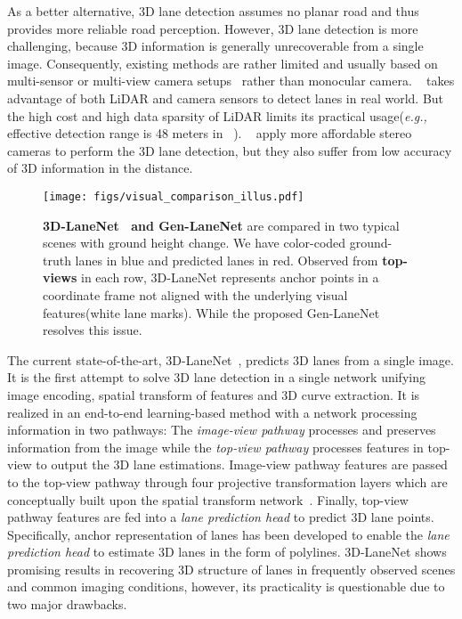 \documentclass[10pt,twocolumn,letterpaper]{article}
\begin{document}
As a better alternative, 3D lane detection assumes no planar road and thus provides more reliable road perception. However, 3D lane detection is more challenging, because 3D information is generally unrecoverable from a single image. Consequently, existing methods are rather limited and usually based on multi-sensor or multi-view camera setups~\cite{YawPitchRool2002,3DLaneStereo2004,MultiSensor2019} rather than monocular camera. ~\cite{MultiSensor2019} takes advantage of both LiDAR and camera sensors to detect lanes in real world. But the high cost and high data sparsity of LiDAR limits its practical usage({\it e.g.,} effective detection range is 48 meters in ~\cite{MultiSensor2019}). ~\cite{YawPitchRool2002,3DLaneStereo2004} apply more affordable stereo cameras to perform the 3D lane detection, but they also suffer from low accuracy of 3D information in the distance.

\begin{figure*}[!h]
  \centering
  \texttt{[image: figs/visual\_comparison\_illus.pdf]}
\caption{{\bf 3D-LaneNet~\cite{Garnett:etal:ICCV2019} and Gen-LaneNet} are compared in two typical scenes with ground height change. We have color-coded ground-truth lanes in blue and predicted lanes in red. Observed from {\bf top-views} in each row, 3D-LaneNet represents anchor points in a coordinate frame not aligned with the underlying visual features(white lane marks). While the proposed Gen-LaneNet resolves this issue.} 
  \label{fig:visual:compare}
\end{figure*}








The current state-of-the-art, 3D-LaneNet~\cite{Garnett:etal:ICCV2019}, predicts 3D lanes from a single image. It is the first attempt to solve 3D lane detection in a single network unifying image encoding, spatial transform of features and 3D curve extraction. It is realized in an end-to-end learning-based method with a network processing information in two pathways: The \textit{image-view pathway} processes and preserves information from the image while the \textit{top-view pathway} processes features in top-view to output the 3D lane estimations. Image-view pathway features are passed to the top-view pathway through four projective transformation layers which are conceptually built upon the spatial transform network~\cite{Jaderberg:etal:SpatialTransformNet:NIPS2015}. Finally, top-view pathway features are fed into a \textit{lane prediction head} to predict 3D lane points. Specifically, anchor representation of lanes has been developed to enable the \textit{lane prediction head} to estimate 3D lanes in the form of polylines. 3D-LaneNet shows promising results in recovering 3D structure of lanes in frequently observed scenes and common imaging conditions, however, its practicality is questionable due to two major drawbacks.
\end{document}
